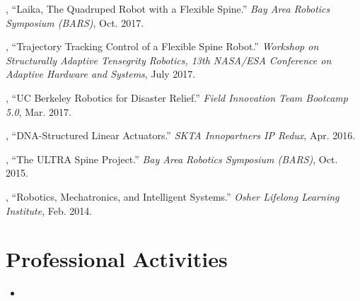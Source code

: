 \documentclass[letterpaper]{deedy-resume} %
\begin{document}
{\begin{etaremune}[itemsep=0.1cm]
\item \underline{{}}, ``Laika, The Quadruped Robot with a Flexible Spine.'' {\it Bay Area Robotics Symposium (BARS)}, Oct. 2017.

\item \underline{{}}, ``Trajectory Tracking Control of a Flexible Spine Robot.'' {\it Workshop on Structurally Adaptive Tensegrity Robotics, 13th NASA/ESA Conference on Adaptive Hardware and Systems}, July 2017.

\item \underline{{}}, ``UC Berkeley Robotics for Disaster Relief.'' {\it Field Innovation Team Bootcamp 5.0}, Mar. 2017.

\item \underline{{}}, ``DNA-Structured Linear Actuators.'' {\it  SKTA Innopartners IP Redux}, Apr. 2016.

\item \underline{{}}, ``The ULTRA Spine Project.'' {\it Bay Area Robotics Symposium (BARS)}, Oct. 2015.

\item \underline{{}}, ``Robotics, Mechatronics, and Intelligent Systems.'' {\it Osher Lifelong Learning Institute}, Feb. 2014.

 \end{etaremune}





\section{Professional Activities}

\vspace{0.2cm}

\begin{itemize}

\item {{ }
\vspace{0.1cm}
}


\end{itemize}}
\end{document}
